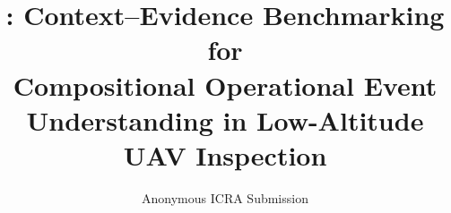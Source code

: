 \title{\dataset: Context--Evidence Benchmarking for\\
Compositional Operational Event Understanding in Low-Altitude UAV Inspection}

\author{
  Anonymous ICRA Submission
}
